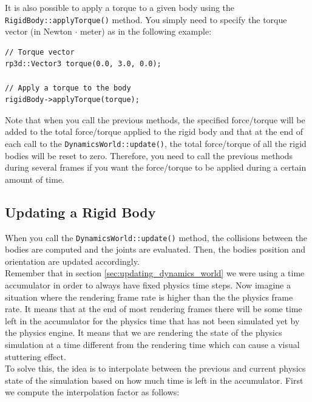 \documentclass[a4paper,12pt]{article}
\begin{document}
     \begin{sloppypar}
        It is also possible to apply a torque to a given body using the \texttt{RigidBody::applyTorque()} method. You simply need to specify the torque vector (in Newton $\cdot$ meter) as
        in the following example: \\
     \end{sloppypar}

    \begin{lstlisting}
// Torque vector
rp3d::Vector3 torque(0.0, 3.0, 0.0);

// Apply a torque to the body
rigidBody->applyTorque(torque);
  \end{lstlisting}

    \vspace{0.6cm}

    Note that when you call the previous methods, the specified force/torque will be added to the total force/torque applied to the rigid body and that at the end of each call to the
    \texttt{DynamicsWorld::update()}, the total force/torque of all the rigid bodies will be reset to zero. Therefore, you need to call the previous methods during several frames
    if you want the force/torque to be applied during a certain amount of time.

    \subsection{Updating a Rigid Body}

    When you call the \texttt{DynamicsWorld::update()} method, the collisions between the bodies are computed and the joints are evaluated. Then, the bodies position
    and orientation are updated accordingly. \\

    Remember that in section \ref{sec:updating_dynamics_world} we were using a time accumulator in order to always have fixed physics time steps.
    Now imagine a situation where the rendering frame rate is higher than the the physics frame rate. It means that at the end of most rendering
    frames there will be some time left in the accumulator for the physics time that has not been simulated yet by the physics engine.
    It means that we are rendering the state of the physics simulation at a time different from the rendering time which can cause a visual stuttering effect. \\

    To solve this, the idea is to interpolate between the previous and current physics state of the simulation based on how much time is left in the
    accumulator. First we compute the interpolation factor as follows: \\
\end{document}
